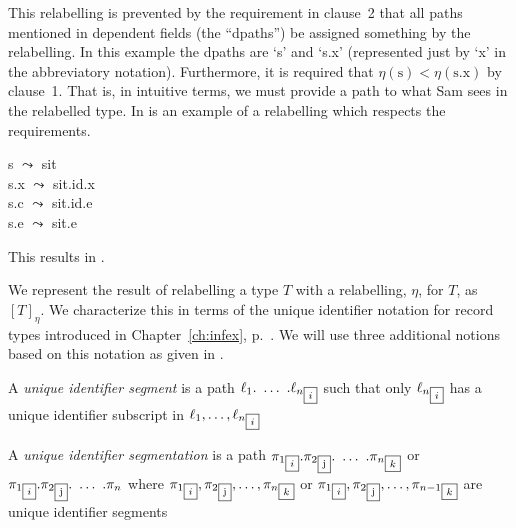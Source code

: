 \begin{shaded}
\begin{ex}
\end{ex} 
This relabelling is prevented by the requirement in clause~2 that all
paths mentioned in dependent fields (the ``dpaths'') be assigned something by the
relabelling.  In this example the dpaths are `s' and `s.x'
(represented just by `x' in the abbreviatory notation).  Furthermore,
it is required that $\eta(\text{s})<\eta(\text{s.x})$ by clause~1.
That is, in intuitive terms, we must provide a path to what Sam sees
in the relabelled type.  In \nexteg{} is an example of a relabelling
which respects the requirements.
\begin{ex} 
  s $\leadsto$ sit\\
  s.x $\leadsto$ sit.id.x\\
  s.c $\leadsto$ sit.id.e\\
  s.e $\leadsto$ sit.e
\end{ex} 
This results in \nexteg{}.
\begin{ex} 
\end{ex} 

We represent the result of relabelling a type $T$ with a relabelling,
$\eta$, for $T$, as $[T]_\eta$.  We characterize this in terms of the
unique identifier notation for record types introduced in
Chapter~\ref{ch:infex}, p.~\pageref{pg:unique-identifier-notation}.
We will use three additional notions based on this notation as given
in \nexteg{}.
\begin{ex} 
\begin{subex} 
 
\item A \textit{unique identifier segment} is a path $\ell_1.\ \ldots\
  .{\ell_n}_{\text{\fbox{$i$}}}$ such that only
  ${\ell_n}_{\text{\fbox{$i$}}}$ has a unique identifier subscript in $\ell_1,\ldots,{\ell_n}_{\text{\fbox{$i$}}}$
 
\item A \textit{unique identifier segmentation} is a path
  ${\pi_1}_{\text{\fbox{$i$}}}.{\pi_2}_{\text{\fbox{j}}}.\ \ldots\
  .{\pi_n}_{\text{\fbox{$k$}}}$ or ${\pi_1}_{\text{\fbox{$i$}}}.{\pi_2}_{\text{\fbox{j}}}.\ \ldots\
  .{\pi_n}$ where ${\pi_1}_{\text{\fbox{$i$}}},{\pi_2}_{\text{\fbox{j}}},\ldots,
  {\pi_n}_{\text{\fbox{$k$}}}$ or ${\pi_1}_{\text{\fbox{$i$}}},{\pi_2}_{\text{\fbox{j}}},\ldots,
  {\pi_{n-1}}_{\text{\fbox{$k$}}}$ are unique identifier segments


\end{subex}
\end{ex}
\end{shaded}
